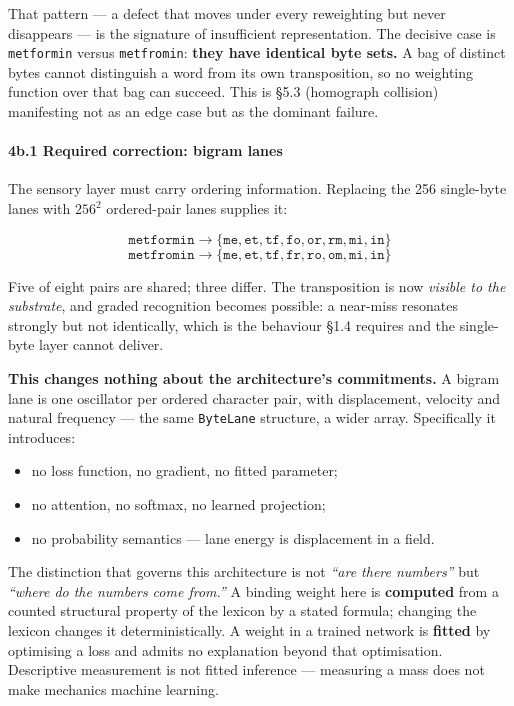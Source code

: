 \documentclass[
  11pt,
  a4paper,
]{article}
\providecommand{\tightlist}{%
  \setlength{\itemsep}{0pt}\setlength{\parskip}{0pt}}
\begin{document}
That pattern --- a defect that moves under every reweighting but never
disappears --- is the signature of insufficient representation. The
decisive case is \texttt{metformin} versus \texttt{metfromin}:
\textbf{they have identical byte sets.} A bag of distinct bytes cannot
distinguish a word from its own transposition, so no weighting function
over that bag can succeed. This is §5.3 (homograph collision)
manifesting not as an edge case but as the dominant failure.

\paragraph{4b.1 Required correction: bigram
lanes}\label{b.1-required-correction-bigram-lanes}

The sensory layer must carry ordering information. Replacing the 256
single-byte lanes with \(256^2\) ordered-pair lanes supplies it:

\[
\texttt{metformin} \rightarrow \{\texttt{me},\texttt{et},\texttt{tf},\texttt{fo},\texttt{or},\texttt{rm},\texttt{mi},\texttt{in}\}
\] \[
\texttt{metfromin} \rightarrow \{\texttt{me},\texttt{et},\texttt{tf},\texttt{fr},\texttt{ro},\texttt{om},\texttt{mi},\texttt{in}\}
\]

Five of eight pairs are shared; three differ. The transposition is now
\emph{visible to the substrate}, and graded recognition becomes
possible: a near-miss resonates strongly but not identically, which is
the behaviour §1.4 requires and the single-byte layer cannot deliver.

\textbf{This changes nothing about the architecture's commitments.} A
bigram lane is one oscillator per ordered character pair, with
displacement, velocity and natural frequency --- the same
\texttt{ByteLane} structure, a wider array. Specifically it introduces:

\begin{itemize}
\tightlist
\item
  no loss function, no gradient, no fitted parameter;
\item
  no attention, no softmax, no learned projection;
\item
  no probability semantics --- lane energy is displacement in a field.
\end{itemize}

The distinction that governs this architecture is not \emph{``are there
numbers''} but \emph{``where do the numbers come from.''} A binding
weight here is \textbf{computed} from a counted structural property of
the lexicon by a stated formula; changing the lexicon changes it
deterministically. A weight in a trained network is \textbf{fitted} by
optimising a loss and admits no explanation beyond that optimisation.
Descriptive measurement is not fitted inference --- measuring a mass
does not make mechanics machine learning.
\end{document}
